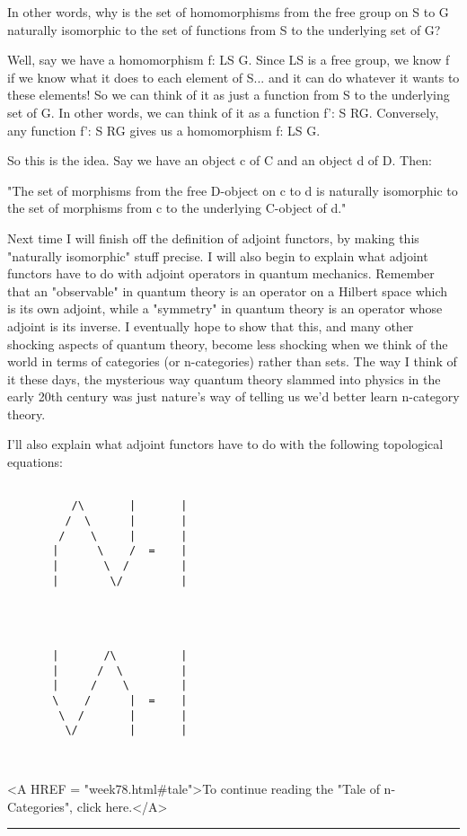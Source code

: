 In other words, why is the set of homomorphisms from the free group on S
to G naturally isomorphic to the set of functions from S to the
underlying set of G?
  
Well, say we have a homomorphism f: LS \to  G.  Since LS is a free group,
we know f if we know what it does to each element of S... and it can
do whatever it wants to these elements!  So we can think of it
as just a function from S to the underlying set of G.  In other words,
we can think of it as a function f': S \to  RG.  Conversely, any function
f': S \to  RG gives us a homomorphism f: LS \to  G.

So this is the idea.  Say we have an object c of C and an object d of D.
Then:

"The set of morphisms from the free D-object on c to d is naturally
isomorphic to the set of morphisms from c to the underlying C-object of
d."

Next time I will finish off the definition of adjoint functors, by
making this "naturally isomorphic" stuff precise.  I will also begin to
explain what adjoint functors have to do with adjoint operators in
quantum mechanics.  Remember that an "observable" in quantum theory is
an operator on a Hilbert space which is its own adjoint, while a
"symmetry" in quantum theory is an operator whose adjoint is its
inverse.  I eventually hope to show that this, and many other shocking
aspects of quantum theory, become less shocking when we think of the
world in terms of categories (or n-categories) rather than sets.  The
way I think of it these days, the mysterious way quantum theory slammed
into physics in the early 20th century was just nature's way of telling
us we'd better learn n-category theory.

I'll also explain what adjoint functors have to do with the following
topological equations:



\begin{verbatim}

          /\       |       |
         /  \      |       |
        /    \     |       |
       |      \    /  =    | 
       |       \  /        |
       |        \/         |




       |       /\          |
       |      /  \         |
       |     /    \        |
       \    /      |  =    | 
        \  /       |       |
         \/        |       |



\end{verbatim}
    




<A HREF = "week78.html#tale">To continue reading the "Tale of
n-Categories", click here.</A>


\par\noindent\rule{\textwidth}{0.4pt}
